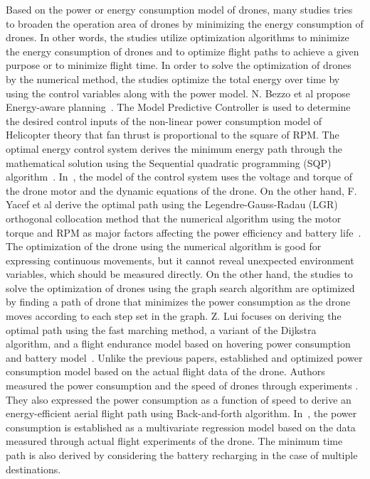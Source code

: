 \documentclass[journal]{./template/IEEEtran}
\begin{document}
Based on the power or energy consumption model of drones, many studies tries to broaden the operation area of drones by minimizing the energy consumption of drones.
In other words, the studies utilize optimization algorithms to minimize the energy consumption of drones and to optimize flight paths to achieve a given purpose or to minimize flight time.
In order to solve the optimization of drones by the numerical method, the studies optimize the total energy over time by using the control variables along with the power model. 
N. Bezzo et al propose Energy-aware planning~\cite{ref_5}. The Model Predictive Controller is used to determine the desired control inputs of the non-linear power consumption model of Helicopter theory that fan thrust is proportional to the square of RPM.
The optimal energy control system derives the minimum energy path through the mathematical solution using the Sequential quadratic programming (SQP) algorithm~\cite{ref_6}. 
In~\cite{ref_6}, the model of the control system uses the voltage and torque of the drone motor and the dynamic equations of the drone. 
On the other hand, F. Yacef et al derive the optimal path using the Legendre-Gauss-Radau (LGR) orthogonal collocation method that the numerical algorithm using the motor torque and RPM as major factors affecting the power efficiency and battery life~\cite{ref_7}. 
The optimization of the drone using the numerical algorithm is good for expressing continuous movements, but it cannot reveal unexpected environment variables, which should be measured directly.
On the other hand, the studies to solve the optimization of drones using the graph search algorithm are optimized by finding a path of drone that minimizes the power consumption as the drone moves according to each step set in the graph. 
Z. Lui focuses on deriving the optimal path using the fast marching method, a variant of the Dijkstra algorithm, and a flight endurance model based on hovering power consumption and battery model~\cite{ref_10}.
Unlike the previous papers, \cite{ref_8,ref_9} established and optimized power consumption model based on the actual flight data of the drone.
Authors measured the power consumption and the speed of drones through experiments \cite{ref_8}. They also expressed the power consumption as a function of speed to derive an energy-efficient aerial flight path using Back-and-forth algorithm.
In~\cite{ref_9}, the power consumption is established as a multivariate regression model based on the data measured through actual flight experiments of the drone.
The minimum time path is also derived by considering the battery recharging in the case of multiple destinations.
\end{document}
